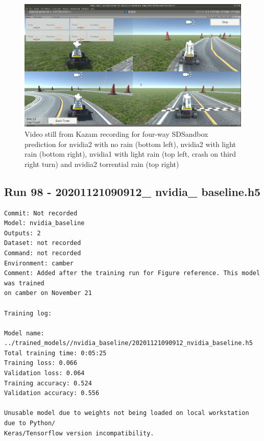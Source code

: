 \begin{figure}[ht]
 \centering 
 \includegraphics[width=\textwidth]{Figures/2948x3_1932x1_genTrack.png}
 \caption{Video still from Kazam recording for four-way SDSandbox prediction for nvidia2 with no rain (bottom left), nvidia2 with light rain (bottom right), nvidia1 with light rain (top left, crash on third right turn) and nvidia2 torrential rain (top right) }
 \label{fig:2948x3_1932x1_genTrack} 
\end{figure}


\subsection{Run 98 - 20201121090912\_ nvidia\_ baseline.h5 }
\label{app_res:98}
\begin{verbatim}
Commit: Not recorded
Model: nvidia_baseline
Outputs: 2
Dataset: not recorded
Command: not recorded
Environment: camber
Comment: Added after the training run for Figure reference. This model was trained
on camber on November 21

Training log:

Model name: ../trained_models//nvidia_baseline/20201121090912_nvidia_baseline.h5
Total training time: 0:05:25
Training loss: 0.066
Validation loss: 0.064
Training accuracy: 0.524
Validation accuracy: 0.556

Unusable model due to weights not being loaded on local workstation due to Python/
Keras/Tensorflow version incompatibility.
\end{verbatim}


